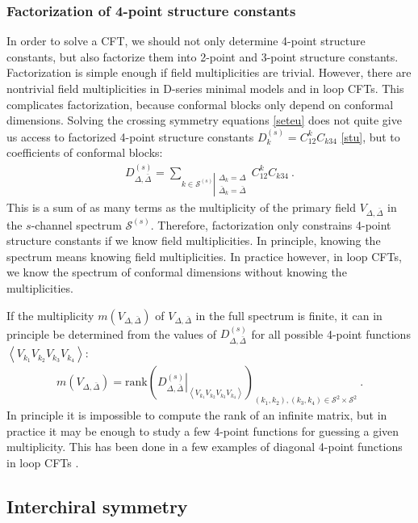 \documentclass[12pt, a4paper]{article}
\theoremstyle{break}
\begin{document}
\subsubsection{Factorization of 4-point structure constants}\label{sec:factor}

In order to solve a CFT, we should not only determine 4-point structure constants, but also factorize them into 2-point and 3-point structure constants. Factorization is simple enough if field multiplicities are trivial. However, there are nontrivial field multiplicities in D-series minimal models and in loop CFTs. 
This complicates factorization, because conformal blocks only depend on conformal dimensions. Solving the crossing symmetry equations \eqref{seteu} does not quite give us access to factorized 4-point structure constants $D^{(s)}_k = C^k_{12}C_{k34}$ \eqref{stu}, but to coefficients of conformal blocks:
\begin{align}
 D^{(s)}_{\Delta,\bar\Delta} = \sum_{k\in\mathcal{S}^{(s)}\left|\substack{\Delta_k=\Delta\\ \bar{\Delta}_k=\bar\Delta}\right.} C^k_{12}C_{k34} \ .
 \label{dcc}
\end{align}
This is a sum of as many terms as the multiplicity of the primary field $V_{\Delta,\bar\Delta}$ in the $s$-channel spectrum $\mathcal{S}^{(s)}$. Therefore, factorization only constrains 4-point structure constants if we know field multiplicities. In principle, knowing the spectrum means knowing field multiplicities. In practice however, in loop CFTs, we know the spectrum of conformal dimensions without knowing the multiplicities. 

If the multiplicity $m(V_{\Delta,\bar\Delta})$ of $V_{\Delta,\bar\Delta}$ in the full spectrum is finite, it can in principle be determined from the values of $D^{(s)}_{\Delta,\bar\Delta}$ for all possible 4-point functions $\left<V_{k_1}V_{k_2}V_{k_3}V_{k_4}\right>$: 
\begin{align}
 m\left(V_{\Delta,\bar\Delta}\right) = \text{rank}\left(\left.D^{(s)}_{\Delta,\bar\Delta}\right|_{\left<V_{k_1}V_{k_2}V_{k_3}V_{k_4}\right>}\right)_{(k_1,k_2),(k_3,k_4)\in\mathcal{S}^2\times \mathcal{S}^2}\ .
\end{align}
In principle it is impossible to compute the rank of an infinite matrix, but 
in practice it may be enough to study a few 4-point functions for guessing a given multiplicity. This has been done in a few examples of diagonal 4-point functions in loop CFTs \cite{rib22}.

\subsection{Interchiral symmetry} \label{sec:icb}
\end{document}
